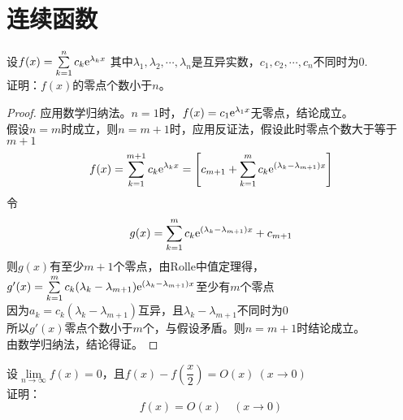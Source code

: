 \section{连续函数}

\begin{proposition}

    设$f(x) = \sum\limits_{k=1}^{n}{c_k\mathrm{e}^{\lambda_k x}}$
    其中$\lambda_1,\lambda_2,\cdots,\lambda_n$是互异实数，$c_1, c_2, \cdots , c_n$不同时为$0$.\\
    证明：$f(x)$的零点个数小于$n$。

\end{proposition}

\begin{proof}

    应用数学归纳法。$n=1$时，$f(x) = c_1 \mathrm{e}^{\lambda_1 x}$无零点，结论成立。\\
    假设$n = m$时成立，则$n = m + 1$时，应用反证法，假设此时零点个数大于等于$m+1$
    $$f(x) = \sum\limits_{k=1}^{m+1}{c_k\mathrm{e}^{\lambda_k x}} = \left[c_{m+1} + \sum\limits_{k=1}^{m}{c_k\mathrm{e}^{(\lambda_k - \lambda_{m+1}) x}}\right]$$
    令
    $$g(x) = \sum\limits_{k=1}^{m}{c_k\mathrm{e}^{(\lambda_k - \lambda_{m+1}) x}} + c_{m+1}$$
    则$g(x)$有至少$m+1$个零点，由\textup{Rolle}中值定理得，$g'(x) = \sum\limits_{k=1}^{m}{c_k (\lambda_k - \lambda_{m+1}) \mathrm{e}^{(\lambda_k - \lambda_{m+1}) x}}$至少有$m$个零点\\
    因为$a_k = c_k(\lambda_k - \lambda_{m+1})$互异，且$\lambda_k - \lambda_{m+1}$不同时为$0$\\
    所以$g'(x)$零点个数小于$m$个，与假设矛盾。则$n = m+1$时结论成立。\\
    由数学归纳法，结论得证。

\end{proof}

\begin{proposition}

    设$\lim\limits_{n\to\infty}{f(x)} = 0$，且$f(x) - f\left(\dfrac{x}{2}\right) = O(x) \ (x\to 0)$\\
    证明：
    $$f(x) = O(x) \quad (x \to 0)$$

\end{proposition}

